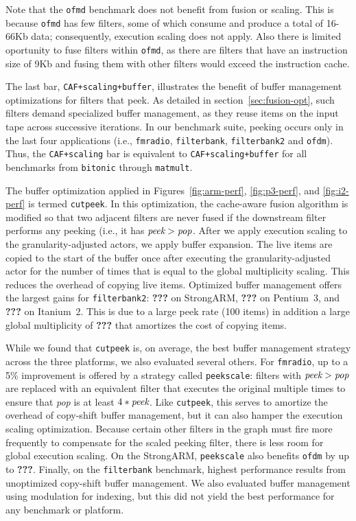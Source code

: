 Note that the \texttt{ofmd} benchmark does not benefit from fusion or
scaling. This is because \texttt{ofmd} has few filters, some of which
consume and produce a total of 16-66Kb data; consequently, execution
scaling does not apply.  Also there is limited oportunity to fuse
filters within \texttt{ofmd}, as there are filters that have an
instruction size of 9Kb and fusing them with other filters would
exceed the instruction cache.

The last bar, {\tt CAF+scaling+buffer}, illustrates the benefit of
buffer management optimizations for filters that peek.  As detailed in
section~\ref{sec:fusion-opt}, such filters demand specialized buffer
management, as they reuse items on the input tape across successive
iterations.  In our benchmark suite, peeking occurs only in the last
four applications (i.e., \texttt{fmradio}, \texttt{filterbank},
\texttt{filterbank2} and \texttt{ofdm}).  Thus, the {\tt CAF+scaling}
bar is equivalent to {\tt CAF+scaling+buffer} for all benchmarks from
{\tt bitonic} through {\tt matmult}.

The buffer optimization applied in Figures~\ref{fig:arm-perf},
\ref{fig:p3-perf}, and \ref{fig:i2-perf} is termed {\tt cutpeek}.  In
this optimization, the cache-aware fusion algorithm is modified so
that two adjacent filters are never fused if the downstream filter
performs any peeking (i.e., it has $\mbox{\it peek} > \mbox{\it pop}$.
After we apply execution scaling to the granularity-adjusted actors,
we apply buffer expansion.  The live items are copied to the start of
the buffer once after executing the granularity-adjusted actor for the
number of times that is equal to the global multiplicity scaling. This
reduces the overhead of copying live items.  Optimized buffer
management offers the largest gains for {\tt filterbank2}: {\bf ???}
on StrongARM, {\bf ???} on Pentium~3, and {\bf ???} on Itanium~2.
This is due to a large peek rate (100 items) in addition a large
global multiplicity of {\bf ???} that amortizes the cost of copying
items.

While we found that {\tt cutpeek} is, on average, the best buffer
management strategy across the three platforms, we also evaluated
several others.  For {\tt fmradio}, up to a 5\% improvement is offered
by a strategy called {\tt peekscale}: filters with $\mbox{\it
peek}>\mbox{\it pop}$ are replaced with an equivalent filter that
executes the original multiple times to ensure that {\it pop} is at
least $4*\mbox{\it peek}$.  Like {\tt cutpeek}, this serves to
amortize the overhead of copy-shift buffer management, but it can also
hamper the execution scaling optimization.  Because certain other
filters in the graph must fire more frequently to compensate for the
scaled peeking filter, there is less room for global execution
scaling.  On the StrongARM, {\tt peekscale} also benefits {\tt ofdm}
by up to {\bf ???}.  Finally, on the {\tt filterbank} benchmark,
highest performance results from unoptimized copy-shift buffer
management.  We also evaluated buffer management using modulation for
indexing, but this did not yield the best performance for any
benchmark or platform.

